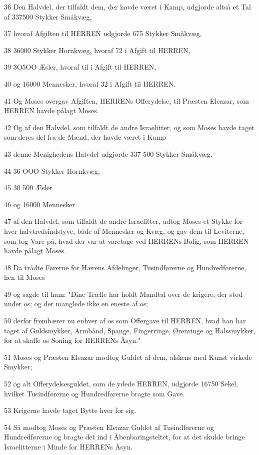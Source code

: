 \par 36 Den Halvdel, der tilfaldt dem, der havde været i Kamp, udgjorde altså et Tal af 337500 Stykker Småkvæg,
\par 37 hvoraf Afgiften til HERREN udgjorde 675 Stykker Småkvæg,
\par 38 36000 Stykker Hornkvæg, hvoraf 72 i Afgift til HERREN,
\par 39 3O5OO Æsler, hvoraf til i Afgift til HERREN,
\par 40 og 16000 Mennesker, hvoraf 32 i Afgift til HERREN.
\par 41 Og Moses overgav Afgiften, HERRENs Offerydelse, til Præsten Eleazar, som HERREN havde pålagt Moses.
\par 42 Og af den Halvdel, som tilfaldt de andre Israelitter, og som Moses havde taget som deres del fra de Mænd, der havde været i Kamp
\par 43 denne Menighedens Halvdel udgjorde 337 500 Stykker Småkvæg,
\par 44 36 OOO Stykker Hornkvæg,
\par 45 30 500 Æsler
\par 46 og 16000 Mennesker
\par 47 af den Halvdel, som tilfaldt de andre Israelitter, udtog Moses et Stykke for hver halvtredsindstyve, både af Mennesker og Kvæg, og gav dem til Leviterne, som tog Vare på, hvad der var at varetage ved HERRENs Bolig, som HERREN havde pålagt Moses.
\par 48 Da trådte Førerne for Hærens Afdelinger, Tusindførerne og Hundredførerne, hen til Moses
\par 49 og sagde til ham: "Dine Trælle har holdt Mandtal over de krigere, der stod under os; og der manglede ikke en eneste af os;
\par 50 derfor frembærer nu enhver af os som Offergave til HERREN, hvad han har taget af Guldsmykker, Armbånd, Spange, Fingerringe, Ørenringe og Halssmykker, for at skaffe os Soning for HERRENs Åsyn."
\par 51 Moses og Præsten Eleazar modtog Guldet af dem, alskens med Kunst virkede Smykker;
\par 52 og alt Offerydelsesguldet, som de ydede HERREN, udgjorde 16750 Sekel, hvilket Tusindførerne og Hundredførerne bragte som Gave.
\par 53 Krigerne havde taget Bytte hver for sig.
\par 54 Så modtog Moses og Præsten Eleazar Guldet af Tusindførerne og Hundredførerne og bragte det ind i Åbenbaringsteltet, for at det skulde bringe Israelitterne i Minde for HERRENs Åsyn.

